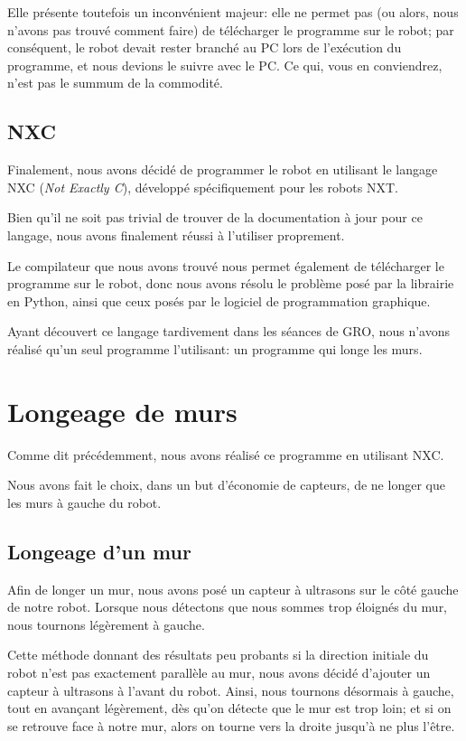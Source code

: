\documentclass{report}
\begin{document}
Elle présente toutefois un inconvénient majeur: elle ne permet pas (ou
alors, nous n'avons pas trouvé comment faire) de télécharger le
programme sur le robot; par conséquent, le robot devait rester branché
au PC lors de l'exécution du programme, et nous devions le suivre avec
le PC. Ce qui, vous en conviendrez, n'est pas le summum de la commodité.

\subsection{NXC}

Finalement, nous avons décidé de programmer le robot en utilisant le
langage NXC (\emph{Not Exactly C}), développé spécifiquement pour
les robots NXT.

Bien qu'il ne soit pas trivial de trouver de la documentation à jour
pour ce langage, nous avons finalement réussi à l'utiliser proprement.

Le compilateur que nous avons trouvé nous permet également de
télécharger le programme sur le robot, donc nous avons résolu le
problème posé par la librairie en Python, ainsi que ceux posés par le
logiciel de programmation graphique.

Ayant découvert ce langage tardivement dans les séances de GRO, nous
n'avons réalisé qu'un seul programme l'utilisant: un programme qui
longe les murs.

\section{Longeage de murs}

Comme dit précédemment, nous avons réalisé ce programme en utilisant
NXC.

Nous avons fait le choix, dans un but d'économie de capteurs, de ne
longer que les murs à gauche du robot.

\subsection{Longeage d'un mur}

Afin de longer un mur, nous avons posé un capteur à ultrasons sur le
côté gauche de notre robot. Lorsque nous détectons que nous sommes
trop éloignés du mur, nous tournons légèrement à gauche.

Cette méthode donnant des résultats peu probants si la direction
initiale du robot n'est pas exactement parallèle au mur, nous avons
décidé d'ajouter un capteur à ultrasons à l'avant du robot. Ainsi,
nous tournons désormais à gauche, tout en avançant légèrement, dès
qu'on détecte que le mur est trop loin; et si on se retrouve face à
notre mur, alors on tourne vers la droite jusqu'à ne plus l'être.
\end{document}
